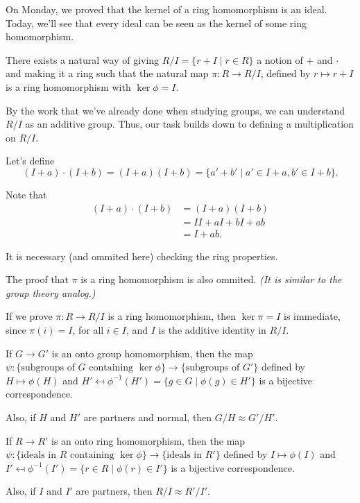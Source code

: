 
On Monday, we proved that the kernel of a ring homomorphism is an ideal. Today, we'll see that every ideal can be seen as the kernel of some ring homomorphism.

\begin{thm}
	There exists a natural way of giving $R/I = \{r + I \mid r \in R\}$ a notion of $+$ and $\cdot$ and making it a ring such that the natural map $\pi: R \to R/I$, defined by $r \mapsto r +  I$ is a ring homomorphism with $\ker\phi = I$.
\end{thm}
\begin{sk}
	By the work that we've already done when studying groups, we can understand $R/I$ as an additive group. Thus, our task builds down to defining a multiplication on $R/I$.

	Let's define \[(I + a)\cdot(I+b) = (I + a)(I + b) = \{a' + b' \mid a'\in I+a, b'\in I+b\}.\] 

	Note that
	\begin{align*}
		(I + a)\cdot(I + b) &= (I + a)(I + b)\\
							&= II + aI + bI + ab\\
							&= I + ab.
	\end{align*}

	It is necessary (and ommited here) checking the ring properties.

	The proof that $\pi$ is a ring homomorphism is also ommited. \emph{(It is similar to the group theory analog.)}
\end{sk}

\begin{rem}
	If we prove $\pi: R \to R/I$ is a ring homomorphism, then $\ker \pi = I$ is immediate, since $\pi(i) = I$, for all $i \in I$, and $I$ is the additive identity in $R/I$.
\end{rem}


\begin{thm}
	If $G \to G'$ is an onto group homomorphism, then the map $\psi: \{\text{subgroups of $G$ containing $\ker\phi$}\} \to \{\text{subgroups of $G'$}\}$ defined by $H \mapsto \phi(H)$ and $H' \mapsfrom \phi^{-1}(H') = \{g \in G \mid \phi(g) \in H'\}$ is a bijective correspondence.

		Also, if $H$ and $H'$ are partners and normal, then $G/H \approx G'/H'$.
\end{thm}

\begin{thm}
	If $R \to R'$ is an onto ring homomorphism, then the map $\psi: \{\text{ideals in $R$ containing $\ker\phi$}\} \to \{\text{ideals in $R'$}\}$ defined by $I \mapsto \phi(I)$ and $I' \mapsfrom \phi^{-1}(I') = \{r \in R \mid \phi(r) \in I'\}$ is a bijective correspondence.

		Also, if $I$ and $I'$ are partners, then $R/I \approx R'/I'$.
\end{thm}

